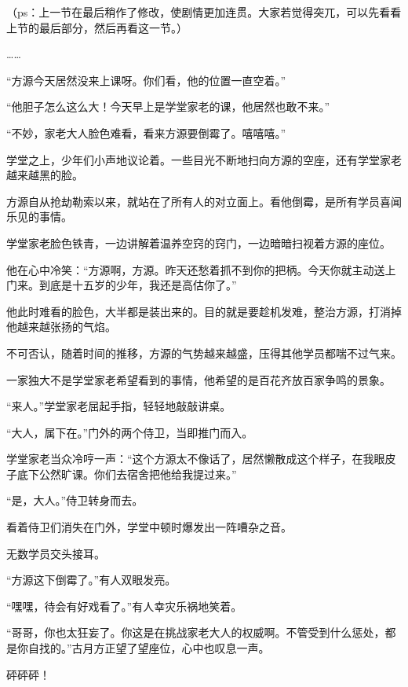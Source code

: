 
\begin{this_body}



（ps：上一节在最后稍作了修改，使剧情更加连贯。大家若觉得突兀，可以先看看上节的最后部分，然后再看这一节。）

……

“方源今天居然没来上课呀。你们看，他的位置一直空着。”

“他胆子怎么这么大！今天早上是学堂家老的课，他居然也敢不来。”

“不妙，家老大人脸色难看，看来方源要倒霉了。嘻嘻嘻。”

学堂之上，少年们小声地议论着。一些目光不断地扫向方源的空座，还有学堂家老越来越黑的脸。

方源自从抢劫勒索以来，就站在了所有人的对立面上。看他倒霉，是所有学员喜闻乐见的事情。

学堂家老脸色铁青，一边讲解着温养空窍的窍门，一边暗暗扫视着方源的座位。

他在心中冷笑：“方源啊，方源。昨天还愁着抓不到你的把柄。今天你就主动送上门来。到底是十五岁的少年，我还是高估你了。”

他此时难看的脸色，大半都是装出来的。目的就是要趁机发难，整治方源，打消掉他越来越张扬的气焰。

不可否认，随着时间的推移，方源的气势越来越盛，压得其他学员都喘不过气来。

一家独大不是学堂家老希望看到的事情，他希望的是百花齐放百家争鸣的景象。

“来人。”学堂家老屈起手指，轻轻地敲敲讲桌。

“大人，属下在。”门外的两个侍卫，当即推门而入。

学堂家老当众冷哼一声：“这个方源太不像话了，居然懒散成这个样子，在我眼皮子底下公然旷课。你们去宿舍把他给我提过来。”

“是，大人。”侍卫转身而去。

看着侍卫们消失在门外，学堂中顿时爆发出一阵嘈杂之音。

无数学员交头接耳。

“方源这下倒霉了。”有人双眼发亮。

“嘿嘿，待会有好戏看了。”有人幸灾乐祸地笑着。

“哥哥，你也太狂妄了。你这是在挑战家老大人的权威啊。不管受到什么惩处，都是你自找的。”古月方正望了望座位，心中也叹息一声。

砰砰砰！


\end{this_body}
